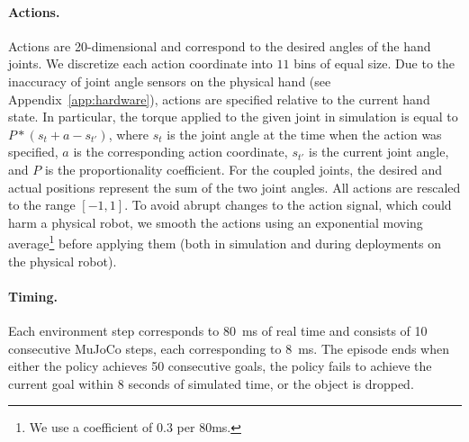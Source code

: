 \paragraph{Actions.}
Actions are \num{20}-dimensional and correspond to the desired angles of the hand joints.
We discretize each action coordinate into $11$ bins of equal size.
Due to the inaccuracy of joint angle sensors
on the physical hand (see Appendix~\ref{app:hardware}), actions are specified
relative to the current hand state.
In particular, the torque applied to the given joint in simulation is equal to $P*(s_t+a-s_{t'})$, where
$s_{t}$ is the joint angle at the time when the action was specified,
$a$ is the corresponding action coordinate, 
$s_{t'}$ is the current joint angle,
 and $P$ is the proportionality coefficient.
For the coupled joints, the desired and actual positions represent the sum of the two joint angles.
All actions are rescaled to the range $[-1,1]$.
To avoid abrupt changes to the action signal, which could harm a physical robot,
we smooth the actions using an exponential moving average\footnote{We use a coefficient of $0.3$ per 80ms.}
before applying them (both in simulation and during deployments on the physical robot).

\paragraph{Timing.}
Each environment step corresponds to \SI{80}{\ms} of real time and consists of \num{10} consecutive MuJoCo steps, each corresponding to \SI{8}{\ms}.
The episode ends when either the policy achieves \num{50} consecutive goals, the policy fails
to achieve the current goal within \num{8} seconds of simulated time, or the object is dropped.
